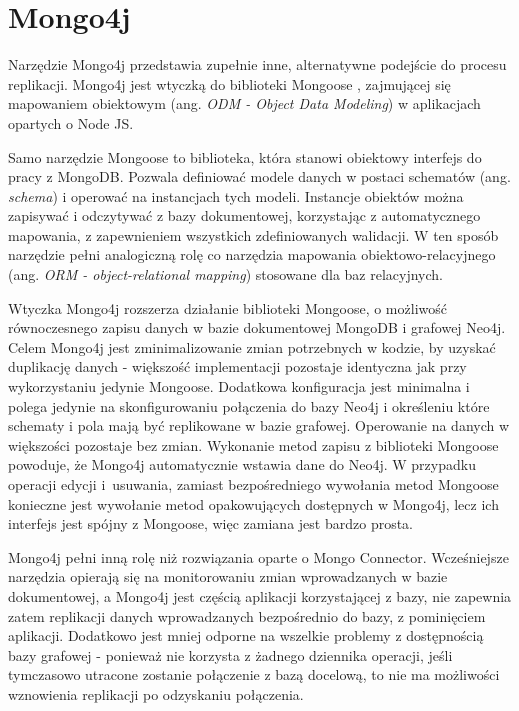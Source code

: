 \documentclass[a4paper,twoside,12pt]{book}
\newcommand{\obcy}[1]{\emph{#1}}
\newcommand{\ang}[1]{{\selectlanguage{british}\obcy{#1}}}
\begin{document}
\section{Mongo4j}

Narzędzie Mongo4j \cite{bib:mongo4j-npm, bib:mongo4j-github} przedstawia zupełnie inne, alternatywne podejście do procesu replikacji. Mongo4j jest wtyczką do biblioteki Mongoose \cite{bib:mongo4j-mongoose}, zajmującej się mapowaniem obiektowym (ang. \ang{ODM - Object Data Modeling}) w aplikacjach opartych o Node JS.

Samo narzędzie Mongoose to biblioteka, która stanowi obiektowy interfejs do pracy z MongoDB. Pozwala definiować modele danych w postaci schematów (ang. \ang{schema}) i operować na instancjach tych modeli. Instancje obiektów można zapisywać i odczytywać z bazy dokumentowej, korzystając z automatycznego mapowania, z zapewnieniem wszystkich zdefiniowanych walidacji. W ten sposób narzędzie pełni analogiczną rolę co narzędzia mapowania obiektowo-relacyjnego (ang. \ang{ORM - object-relational mapping}) stosowane dla baz relacyjnych. 

Wtyczka Mongo4j rozszerza działanie biblioteki Mongoose, o możliwość równoczesnego zapisu danych w bazie dokumentowej MongoDB i grafowej Neo4j. Celem Mongo4j jest zminimalizowanie zmian potrzebnych w kodzie, by uzyskać duplikację danych - większość implementacji pozostaje identyczna jak przy wykorzystaniu jedynie Mongoose. Dodatkowa konfiguracja jest minimalna i polega jedynie na skonfigurowaniu połączenia do bazy Neo4j i określeniu które schematy i pola mają być replikowane w bazie grafowej. Operowanie na danych w większości pozostaje bez zmian. Wykonanie metod zapisu z biblioteki Mongoose powoduje, że Mongo4j automatycznie wstawia dane do Neo4j. W przypadku operacji edycji i~usuwania, zamiast bezpośredniego wywołania metod Mongoose konieczne jest wywołanie metod opakowujących dostępnych w Mongo4j, lecz ich interfejs jest spójny z Mongoose, więc zamiana jest bardzo prosta.  

Mongo4j pełni inną rolę niż rozwiązania oparte o Mongo Connector. Wcześniejsze narzędzia opierają się na monitorowaniu zmian wprowadzanych w bazie dokumentowej, a Mongo4j jest częścią aplikacji korzystającej z bazy, nie zapewnia zatem replikacji danych wprowadzanych bezpośrednio do bazy, z pominięciem aplikacji. Dodatkowo jest mniej odporne na wszelkie problemy z dostępnością bazy grafowej - ponieważ nie korzysta z żadnego dziennika operacji, jeśli tymczasowo utracone zostanie połączenie z bazą docelową, to nie ma możliwości wznowienia replikacji po odzyskaniu połączenia.
\end{document}

